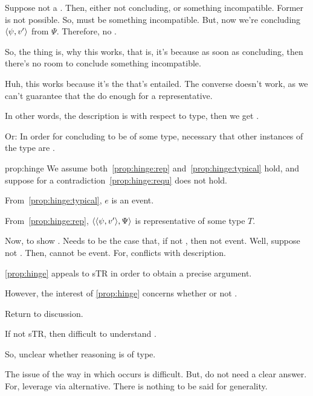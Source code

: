 \begin{note}
  {
    \color{red}
    Suppose not a \requ{}.
    Then, either not concluding, or something incompatible.
    Former is not possible.
    So, must be something incompatible.
    But, now we're concluding \(\langle \psi, v' \rangle\) from \(\Psi\).
    Therefore, no \pevent{}.

    So, the thing is, why this works, that is, it's because as soon as concluding, then there's no room to conclude something incompatible.
  }

  {
    \color{red}
    Huh, this works because it's the \requ{} that's entailed.
    The converse doesn't work, as we can't guarantee that the \requ{} do enough for a representative.
  }

  In other words, the description is with respect to type, then we get \requ{}.

  Or:
  In order for concluding to be of some type, necessary that other instances of the type are .

  \begin{argument}{prop:hinge}
    We assume both~\ref{prop:hinge:rep} and~\ref{prop:hinge:typical} hold, and suppose for a contradiction~\ref{prop:hinge:requ} does not hold.

    From~\ref{prop:hinge:typical}, \(e\) is an event.

    From~\ref{prop:hinge:rep}, \(\langle \langle \psi, v' \rangle, \Psi \rangle\) is representative of some type \(T\).

    Now, to show \requ{}.
    Needs to be the case that, if not \fc{}, then not event.
    Well, suppose not \fc{}.
    Then, cannot be event.
    For, conflicts with description.
  \end{argument}
\end{note}

\begin{note}
  \autoref{prop:hinge} appeals to {\color{red} sTR{}} in order to obtain a precise argument.

  However, the interest of \autoref{prop:hinge} concerns whether or not \tR{}.

  Return to discussion.

  If not {\color{red} sTR{}}, then difficult to understand \tR{}.

  So, unclear whether reasoning is of type.

  The issue of the way in which \ninf{} occurs is difficult.
  But, do not need a clear answer.
  For, leverage via alternative.
  There is nothing to be said for generality.
\end{note}

